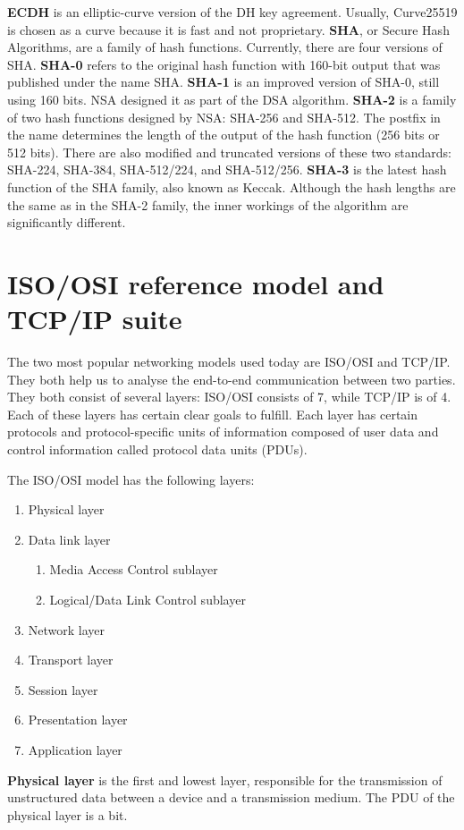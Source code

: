 \textbf{ECDH} is an elliptic-curve version of the DH key agreement. Usually, Curve25519 is chosen as a curve because it is fast and not proprietary.
\textbf{SHA}, or Secure Hash Algorithms, are a family of hash functions. Currently, there are four versions of SHA. \textbf{SHA-0} refers to the original hash function with 160-bit output that was published under the name SHA. \textbf{SHA-1} is an improved version of SHA-0, still using 160 bits. NSA designed it as part of the DSA algorithm. \textbf{SHA-2} is a family of two hash functions designed by NSA: SHA-256 and SHA-512. The postfix in the name determines the length of the output of the hash function (256 bits or 512 bits). There are also modified and truncated versions of these two standards: SHA-224, SHA-384, SHA-512/224, and SHA-512/256.
\textbf{SHA-3} is the latest hash function of the SHA family, also known as Keccak. Although the hash lengths are the same as in the SHA-2 family, the inner workings of the algorithm are significantly different.

\section{ISO/OSI reference model and TCP/IP suite}
The two most popular networking models used today are ISO/OSI and TCP/IP. They both help us to analyse the end-to-end communication between two parties. They both consist of several layers: ISO/OSI consists of 7, while TCP/IP is of 4. Each of these layers has certain clear goals to fulfill. Each layer has certain protocols and protocol-specific units of information composed of user data and control information called protocol data units (PDUs).

The ISO/OSI model has the following layers:
\begin{enumerate}
\item Physical layer
\item Data link layer
\begin{enumerate}
    \item Media Access Control sublayer
    \item Logical/Data Link Control sublayer
\end{enumerate}
\item Network layer
\item Transport layer
\item Session layer
\item Presentation layer
\item Application layer
\end{enumerate}
\textbf{Physical layer} is the first and lowest layer, responsible for the transmission of unstructured data between a device and a transmission medium. The PDU of the physical layer is a bit.

